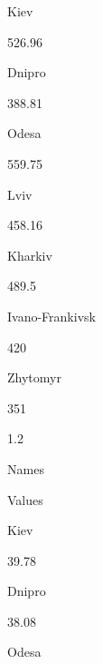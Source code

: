 \documentclass[a4paper,portrait,12pt]{article}
\begin{document}
\begin{flushleft}
Kiev
\end{flushleft}


526.96


\begin{flushleft}
Dnipro
\end{flushleft}


388.81


\begin{flushleft}
Odesa
\end{flushleft}


559.75


\begin{flushleft}
Lviv
\end{flushleft}


458.16


\begin{flushleft}
Kharkiv
\end{flushleft}


489.5


\begin{flushleft}
Ivano-Frankivsk
\end{flushleft}


420


\begin{flushleft}
Zhytomyr
\end{flushleft}


351





1.2





\begin{flushleft}
Names
\end{flushleft}


\begin{flushleft}
Values
\end{flushleft}


\begin{flushleft}
Kiev
\end{flushleft}


39.78


\begin{flushleft}
Dnipro
\end{flushleft}


38.08


\begin{flushleft}
Odesa
\end{flushleft}
\end{document}
